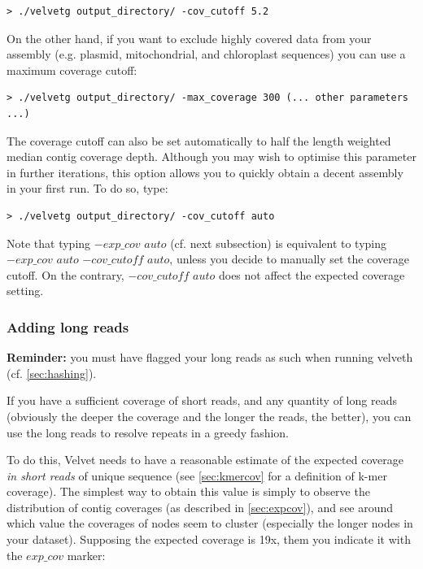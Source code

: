 \documentclass{article}
\begin{document}
\begin{verbatim}
> ./velvetg output_directory/ -cov_cutoff 5.2
\end{verbatim}

On the other hand, if you want to exclude highly covered data from your assembly (e.g. plasmid, mitochondrial, and chloroplast sequences) you can use a maximum coverage cutoff:

\begin{verbatim}
> ./velvetg output_directory/ -max_coverage 300 (... other parameters ...)
\end{verbatim}

The coverage cutoff can also be set automatically to half the length weighted median contig coverage depth. Although you may wish to optimise this parameter in further iterations, this option allows you to quickly obtain a decent assembly in your first run. To do so, type:

\begin{verbatim}
> ./velvetg output_directory/ -cov_cutoff auto
\end{verbatim}

Note that typing $-exp\_cov$ $auto$ (cf. next subsection) is equivalent to typing $-exp\_cov$ $auto$ $-cov\_cutoff$ $auto$, unless you decide to manually set the coverage cutoff. On the contrary, $-cov\_cutoff$ $auto$ does not affect the expected coverage setting.

	\subsubsection{Adding long reads}
	
\textbf{Reminder:} you must have flagged your long reads as such when running
velveth (cf. \ref{sec:hashing}).
	
If you have a sufficient coverage of short reads, and any quantity of long reads (obviously the deeper the coverage and the longer the reads, the better), you can use the long reads to resolve repeats in a greedy fashion. 

To do this, Velvet needs to have a reasonable estimate of the expected coverage \emph{in short reads} of unique sequence (see \ref{sec:kmercov} for a definition of k-mer coverage). The simplest way to obtain this value is simply to observe the distribution of contig coverages (as described in \ref{sec:expcov}), and see around which value the coverages of nodes seem to cluster (especially the longer nodes in your dataset). Supposing the expected coverage is 19x, them you indicate it with the $exp\_cov$ marker:
\end{document}
